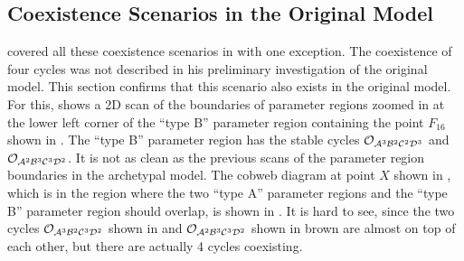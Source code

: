 \subsection{Coexistence Scenarios in the Original Model}

 covered all these coexistence scenarios in \cite{akyuz2022} with one exception.
The coexistence of four cycles was not described in his preliminary investigation of the original model.
This section confirms that this scenario also exists in the original model.
For this,  shows a 2D scan of the boundaries of parameter regions zoomed in at the lower left corner of the ``type B'' parameter region containing the point $F_{16}$ shown in .
The ``type B'' parameter region has the stable cycles $\mathcal{O}_{\mathcal{A}^3\mathcal{B}^2\mathcal{C}^2\mathcal{D}^3}$ and $\mathcal{O}_{\mathcal{A}^2\mathcal{B}^3\mathcal{C}^3\mathcal{D}^2}$.
It is not as clean as the previous scans of the parameter region boundaries in the archetypal model.
The cobweb diagram at point $X$ shown in , which is in the region where the two ``type A'' parameter regions and the ``type B'' parameter region should overlap, is shown in .
It is hard to see, since the two cycles $\mathcal{O}_{\mathcal{A}^3\mathcal{B}^2\mathcal{C}^3\mathcal{D}^2}$ shown in and $\mathcal{O}_{\mathcal{A}^2\mathcal{B}^3\mathcal{C}^3\mathcal{D}^2}$ shown in brown are almost on top of each other, but there are actually 4 cycles coexisting.

